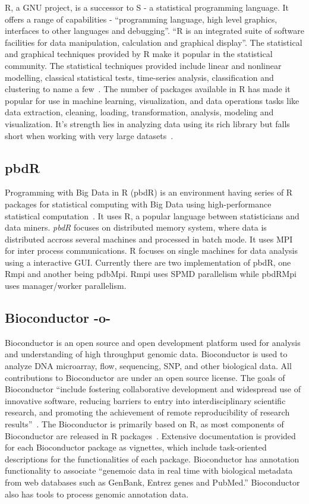 R, a GNU project, is a successor to S - a statistical programming
language. It offers a range of capabilities - ``programming language,
high level graphics, interfaces to other languages and
debugging''. ``R is an integrated suite of software facilities for
data manipulation, calculation and graphical display''. The
statistical and graphical techniques provided by R make it popular in
the statistical community. The statistical techniques provided include
linear and nonlinear modelling, classical statistical tests,
time-series analysis, classification and clustering to name a
few~\cite{www-R}. The number of packages available in R has made it
popular for use in machine learning, visualization, and data
operations tasks like data extraction, cleaning, loading,
transformation, analysis, modeling and visualization. It's strength
lies in analyzing data using its rich library but falls short when
working with very large datasets~\cite{book-R}.
    
\subsection{pbdR}

Programming with Big Data in R (pbdR) is an environment having series
of R packages for statistical computing with Big Data using
high-performance statistical computation~\cite{www-pbdR}. It uses R, a
popular language between statisticians and data miners. \textit{pbdR} focuses
on distributed memory system, where data is distributed accross
several machines and processed in batch mode. It uses MPI for inter
process communications. R focuses on single machines for data analysis
using a interactive GUI. Currently there are two implementation of
pbdR, one Rmpi and another being pdbMpi.  Rmpi uses SPMD parallelism
while pbdRMpi uses manager/worker parallelism.

    \pv

\subsection{Bioconductor -o-}

Bioconductor is an open source and open development platform used for
analysis and understanding of high throughput genomic
data. Bioconductor is used to analyze DNA microarray, flow,
sequencing, SNP, and other biological data. All contributions to
Bioconductor are under an open source license. The goals of
Bioconductor ``include fostering collaborative development and
widespread use of innovative software, reducing barriers to entry into
interdisciplinary scientific research, and promoting the achievement
of remote reproducibility of research
results''~\cite{bioconductor-article-2004}.  The Bioconductor is
primarily based on R, as most components of Bioconductor are released
in R packages~\cite{www-bioconductor-about}.  Extensive documentation
is provided for each Bioconductor package as vignettes, which include
task-oriented descriptions for the functionalities of each
package. Bioconductor has annotation functionality to associate
``genemoic data in real time with biological metadata from web
databases such as GenBank, Entrez genes and PubMed.''  Bioconductor
also has tools to process genomic annotation data.

